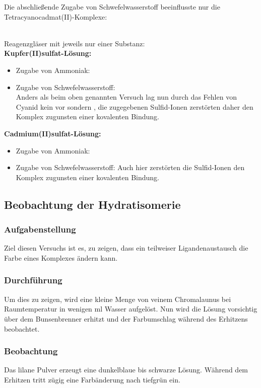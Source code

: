 \documentclass{scrartcl}
\begin{document}
Die abschließende Zugabe von Schwefelwasserstoff beeinflusste nur die Tetracyanocadmat(II)-Komplexe: \\
\\ \par
Reagenzgläser mit jeweils nur einer Substanz: \\
\textbf{Kupfer(II)sulfat-Lösung:}
\begin{itemize}
	\item Zugabe von Ammoniak:
\item Zugabe von Schwefelwasserstoff:
 \\
Anders als beim oben genannten Versuch lag nun durch das Fehlen von Cyanid kein  vor sondern , die zugegebenen Sulfid-Ionen zerstörten daher den Komplex zugunsten einer kovalenten Bindung.
\end{itemize}
\textbf{Cadmium(II)sulfat-Lösung:}
\begin{itemize}
	\item Zugabe von Ammoniak:
\item Zugabe von Schwefelwasserstoff:
Auch hier zerstörten die Sulfid-Ionen den Komplex zugunsten einer kovalenten Bindung.
\end{itemize}

\subsection{Beobachtung der Hydratisomerie}
\subsubsection{Aufgabenstellung}
Ziel diesen Versuchs ist es, zu zeigen, dass ein teilweiser Ligandenaustausch die Farbe eines Komplexes ändern kann.
\subsubsection{Durchführung}
Um dies zu zeigen, wird eine kleine Menge von veinem Chromalaunus  bei Raumtemperatur in wenigen ml Wasser aufgelöst. Nun wird die Lösung vorsichtig über dem Bunsenbrenner erhitzt und der Farbumschlag während des Erhitzens beobachtet.
\subsubsection{Beobachtung}
Das lilane Pulver erzeugt eine dunkelblaue bis schwarze Lösung. Während dem Erhitzen tritt zügig eine Farbänderung nach tiefgrün ein.
\end{document}
